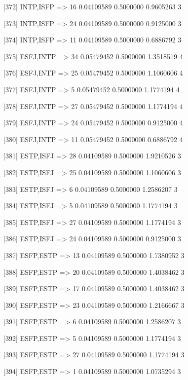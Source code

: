 [372] {INTP,ISFP}           => {16} 0.04109589 0.5000000  0.9605263  3   

[373] {INTP,ISFP}           => {24} 0.04109589 0.5000000  0.9125000  3   

[374] {INTP,ISFP}           => {11} 0.04109589 0.5000000  0.6886792  3   

[375] {ESFJ,INTP}           => {34} 0.05479452 0.5000000  1.3518519  4   

[376] {ESFJ,INTP}           => {25} 0.05479452 0.5000000  1.1060606  4   

[377] {ESFJ,INTP}           => {5}  0.05479452 0.5000000  1.1774194  4   

[378] {ESFJ,INTP}           => {27} 0.05479452 0.5000000  1.1774194  4   

[379] {ESFJ,INTP}           => {24} 0.05479452 0.5000000  0.9125000  4   

[380] {ESFJ,INTP}           => {11} 0.05479452 0.5000000  0.6886792  4   

[381] {ESTP,ISFJ}           => {28} 0.04109589 0.5000000  1.9210526  3   

[382] {ESTP,ISFJ}           => {25} 0.04109589 0.5000000  1.1060606  3   

[383] {ESTP,ISFJ}           => {6}  0.04109589 0.5000000  1.2586207  3   

[384] {ESTP,ISFJ}           => {5}  0.04109589 0.5000000  1.1774194  3   

[385] {ESTP,ISFJ}           => {27} 0.04109589 0.5000000  1.1774194  3   

[386] {ESTP,ISFJ}           => {24} 0.04109589 0.5000000  0.9125000  3   

[387] {ESFP,ESTP}           => {13} 0.04109589 0.5000000  1.7380952  3   

[388] {ESFP,ESTP}           => {20} 0.04109589 0.5000000  1.4038462  3   

[389] {ESFP,ESTP}           => {17} 0.04109589 0.5000000  1.4038462  3   

[390] {ESFP,ESTP}           => {23} 0.04109589 0.5000000  1.2166667  3   

[391] {ESFP,ESTP}           => {6}  0.04109589 0.5000000  1.2586207  3   

[392] {ESFP,ESTP}           => {5}  0.04109589 0.5000000  1.1774194  3   

[393] {ESFP,ESTP}           => {27} 0.04109589 0.5000000  1.1774194  3   

[394] {ESFP,ESTP}           => {1}  0.04109589 0.5000000  1.0735294  3   


